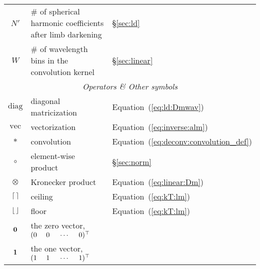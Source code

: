 \documentclass[modern]{aastex631}
\begin{document}
\begin{center}
\begin{longtable}{cll}
        $N'$                                                & \# of spherical harmonic coefficients after limb darkening   & \S\ref{sec:ld}                             \\
        $W$                                                 & \# of wavelength bins in the convolution kernel              & \S\ref{sec:linear}                         \\
        \midrule
        \multicolumn{3}{c}{\emph{Operators \& Other symbols}}                                                                                                           \\
        \midrule
        $\mathrm{diag}$                                     & diagonal matricization                                       & Equation~(\ref{eq:ld:Dmwav})               \\
        $\mathrm{vec}$                                      & vectorization                                                & Equation~(\ref{eq:inverse:alm})          \\
        $*$                                                 & convolution                                                  & Equation~(\ref{eq:deconv:convolution_def}) \\
        $\circ$                                             & element-wise product                                         & \S\ref{sec:norm}           \\
        $\otimes$                                           & Kronecker product                                            & Equation~(\ref{eq:linear:Dm})              \\
        $\ceil*{\,}$                                        & ceiling                                                      & Equation~(\ref{eq:kT:lm})                  \\
        $\floor*{\,}$                                       & floor                                                        & Equation~(\ref{eq:kT:lm})                  \\
        $\bvec{0}$                                          & the zero vector, $(0 \quadquad 0 \quadquad \cdots \quadquad 0)^\top$ &                                                                                                           \\
        $\bvec{1}$                                          & the one vector, $(1 \quadquad 1 \quadquad \cdots \quadquad 1)^\top$ &                                                                                                           \\
    \end{longtable}
\end{center}

\clearpage

\end{document}
